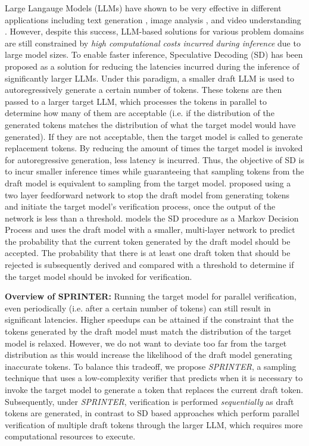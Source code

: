 \documentclass{article}
\theoremstyle{plain}
\theoremstyle{definition}
\theoremstyle{remark}
\begin{document}
Large Langauge Models (LLMs) have shown to be very effective in different applications including text generation \cite{zingale2024language}, image analysis \cite{niu2024text}, and video understanding \cite{tang2024videounderstandinglargelanguage}. However, despite this success, LLM-based solutions for various problem domains are still constrained by \textit{high computational costs incurred during inference} due to large model sizes. To enable faster inference, Speculative Decoding (SD) \cite{leviathan2023fast} has been proposed as a solution for reducing the latencies incurred during the inference of significantly larger LLMs. Under this paradigm, a smaller draft LLM is used to autoregressively generate a certain number of tokens. These tokens are then passed to a larger target LLM, which processes the tokens in parallel to determine how many of them are acceptable (i.e. if the distribution of the generated tokens matches the distribution of what the target model would have generated). If they are not acceptable, then the target model is called to generate replacement tokens. By reducing the amount of times the target model is invoked for autoregressive generation, less latency is incurred. Thus, the objective of SD is to incur smaller inference times while guaranteeing that sampling tokens from the draft model is equivalent to sampling from the target model. \cite{mamou2024dynamicspeculationlookaheadaccelerates} proposed using a two layer feedforward network to stop the draft model from generating tokens and initiate the target model's verification process, once the output of the network is less than a threshold. 
\cite{huang2024specdec++} models the SD procedure as a Markov Decision Process and uses the draft model with a smaller, multi-layer network to predict the probability that the current token generated by the draft model should be accepted. The probability that there is at least one draft token that should be rejected is subsequently derived and compared with a threshold to determine if the target model should be invoked for verification. 


\textbf{Overview of SPRINTER:} Running the target model for parallel verification, even periodically (i.e. after a certain number of tokens) can still result in significant latencies. Higher speedups can be attained if the constraint that the tokens generated by the draft model must match the distribution of the target model is relaxed. However, we do not want to deviate too far from the target distribution as this would increase the likelihood of the draft model generating inaccurate tokens. To balance this tradeoff, we propose \textit{SPRINTER}, a sampling technique that uses a low-complexity verifier that predicts when it is necessary to invoke the target model to generate a token that replaces the current draft token. Subsequently, under \textit{SPRINTER}, verification is performed \textit{sequentially} as draft tokens are generated, in contrast to SD based approaches which perform parallel verification of multiple draft tokens through the larger LLM, which requires more computational resources to execute.  
\end{document}
